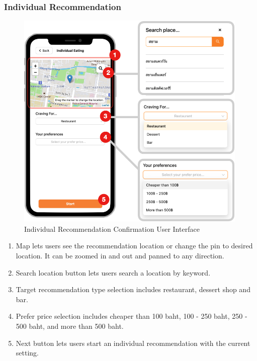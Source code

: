 \documentclass[12pt,oneside,openright,a4paper]{cpe-english-project}
\begin{document}
\subsubsection{Individual Recommendation}
\begin{figure}[H]\centering
\includegraphics[height=300pt]{./images/4ui_IndividualRecommendationConfirmationUserInterface.png}
\caption{Individual Recommendation Confirmation User Interface}\label{fig:4ui_IndividualRecommendationConfirmationUserInterface}
\end{figure}\vspace{-24pt}

\begin{enumerate}
\item Map lets users see the recommendation location or change the pin to desired location. It can be zoomed in and out and panned to any direction.
\item Search location button lets users search a location by keyword.
\item Target recommendation type selection includes restaurant, dessert shop and bar.
\item Prefer price selection includes cheaper than 100 baht, 100 - 250 baht, 250 - 500 baht, and more than 500 baht.
\item Next button lets users start an individual recommendation with the current setting.
\end{enumerate}
\end{document}

